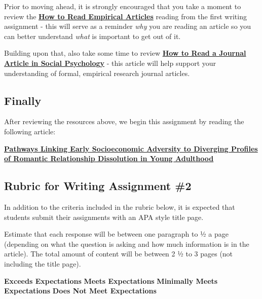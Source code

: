 \documentclass[
]{book}
\begin{document}
\begin{assessment}
Prior to moving ahead, it is strongly encouraged that you take a moment to review the \href{assets/unit_9/Assessment_Empirical_Short.pdf}{\textbf{How to Read Empirical Articles}} reading from the first writing assignment - this will serve as a reminder \emph{why} you are reading an article so you can better understand \emph{what} is important to get out of it.

Building upon that, also take some time to review \href{assets/unit_9/Assessment_Empirical_Long.pdf}{\textbf{How to Read a Journal Article in Social Psychology}} - this article will help support your understanding of formal, empirical research journal articles.

\hypertarget{finally}{%
\subsection*{Finally}\label{finally}}

After reviewing the resources above, we begin this assignment by reading the following article:

\href{assets/unit_9/Romantic_Relationship_Dissolution_in_Young_Adulthood.pdf}{\textbf{Pathways Linking Early Socioeconomic Adversity to Diverging Profiles of Romantic Relationship Dissolution in Young Adulthood}}

\hypertarget{rubric-for-writing-assignment-2}{%
\subsection*{Rubric for Writing Assignment \#2}\label{rubric-for-writing-assignment-2}}

In addition to the criteria included in the rubric below, it is expected that students submit their assignments with an APA style title page.

Estimate that each response will be between one paragraph to ½ a page (depending on what the question is asking and how much information is in the article). The total amount of content will be between 2 ½ to 3 pages (not including the title page).

\textbf{Exceeds Expectations} \textbar{} \textbf{Meets Expectations} \textbar{} \textbf{Minimally Meets Expectations} \textbar{} \textbf{Does Not Meet Expectations} \textbar{}


\end{assessment}
\end{document}
